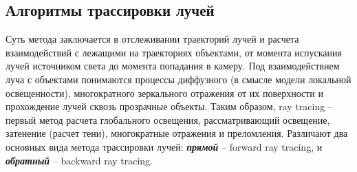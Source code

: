\documentclass[12pt, a4paper, utf8]{article}
\begin{document}
\subsection{Алгоритмы трассировки лучей}
Суть метода заключается в отслеживании траекторий лучей и расчета взаимодействий с лежащими на траекториях объектами, от момента испускания лучей источником света до момента попадания в камеру. Под взаимодействием луча с объектами понимаются процессы диффузного (в смысле модели локальной освещенности), многократного зеркального отражения от их поверхности и прохождение лучей сквозь прозрачные объекты. Таким образом, ray tracing – первый метод расчета глобального освещения, рассматривающий освещение, затенение (расчет тени), многократные отражения и преломления. Различают два основных вида метода трассировки лучей: \textbf{\textit{прямой}} -- forward ray tracing, и \textbf{\textit{обратный}} -- backward ray tracing.
\end{document}
